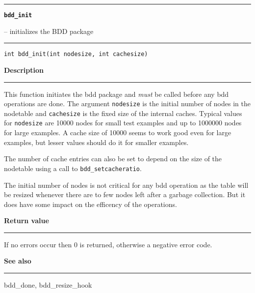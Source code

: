 \begin{minipage}{\textwidth}

\noindent\begin{minipage}{\textwidth}
\rule{\textwidth}{0.5mm}
{\tt\bf bdd\_init }
\--- initializes the BDD package  \hspace{\fill}
\\\rule[1.5ex]{\textwidth}{0.5mm}
\end{minipage}

\noindent\begin{verbatim}
int bdd_init(int nodesize, int cachesize) 
\end{verbatim}

\vspace{\parsep}\noindent
{\bf Description}\\\rule[1.5ex]{\textwidth}{0.2mm}\vspace{-1.5ex}\setlength{\parindent}{1em}
This function initiates the bdd package and {\em must} be called
          before any bdd operations are done. The argument {\tt nodesize}
	  is the initial number of nodes in the nodetable and {\tt cachesize}
	  is the fixed size of the internal caches. Typical values for
	  {\tt nodesize} are 10000 nodes for small test examples and up to
	  1000000 nodes for large examples. A cache size of 10000 seems to
	  work good even for large examples, but lesser values should do it
	  for smaller examples.

	  The number of cache entries can also be set to depend on the size
	  of the nodetable using a call to {\tt bdd\_setcacheratio}.
	  
	  The initial number of nodes is not critical for any bdd operation
	  as the table will be resized whenever there are to few nodes left
	  after a garbage collection. But it does have some impact on the
	  efficency of the operations. 

\setlength{\parindent}{0em}\vspace{\parsep}\vspace{\baselineskip}\noindent
{\bf Return value}\\\rule[1.5ex]{\textwidth}{0.2mm}\vspace{-1.5ex}
If no errors occur then 0 is returned, otherwise
          a negative error code. 

\vspace{\parsep}\vspace{\baselineskip}\noindent
{\bf See also}\\\rule[1.5ex]{\textwidth}{0.2mm}\vspace{-1.5ex}
bdd\_done, bdd\_resize\_hook 
\end{minipage}
